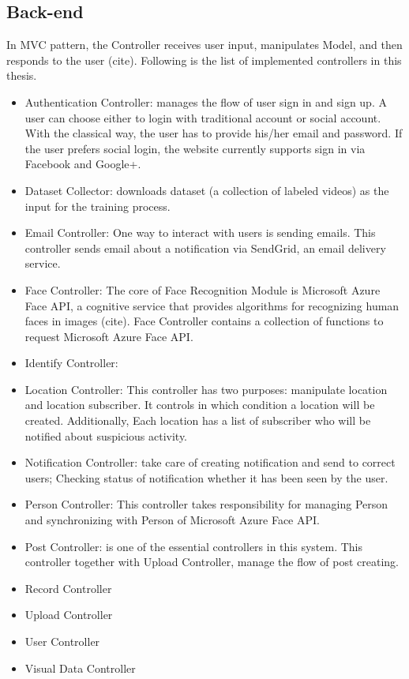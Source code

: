 \subsection{Back-end}
In MVC pattern, the Controller receives user input, manipulates Model, and then responds to the user (cite). Following is the list of implemented controllers in this thesis.
\begin{itemize}
	\item Authentication Controller: manages the flow of user sign in and sign up. A user can choose either to login with traditional account or social account. With the classical way, the user has to provide his/her email and password. If the user prefers social login, the website currently supports sign in via Facebook and Google+.
	\item Dataset Collector: downloads dataset (a collection of labeled videos) as the input for the training process.
	\item Email Controller: One way to interact with users is sending emails. This controller sends email about a notification via SendGrid, an email delivery service.
	\item Face Controller: The core of Face Recognition Module is Microsoft Azure Face API, a cognitive service that provides algorithms for recognizing human faces in images (cite). Face Controller contains a collection of functions to request Microsoft Azure Face API.
	\item Identify Controller: 
	\item Location Controller: This controller has two purposes: manipulate location and location subscriber. It controls in which condition a location will be created. Additionally, Each location has a list of subscriber who  will be notified about suspicious activity.
	\item Notification Controller:  take care of creating notification and send to correct users; Checking status of notification whether it has been seen by the user.
	\item Person Controller: This controller takes responsibility for managing Person and synchronizing with Person of Microsoft Azure Face API.
	\item Post Controller: is one of the essential controllers in this system. This controller together with Upload Controller, manage the flow of post creating.
	\item Record Controller
	\item Upload Controller
	\item User Controller
	\item Visual Data Controller
	      
\end{itemize}
